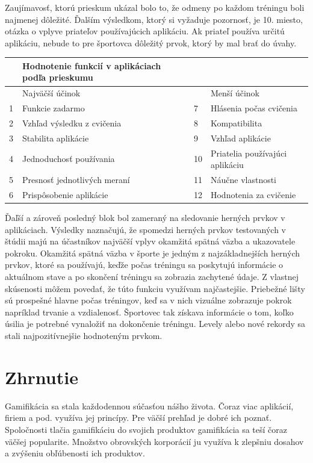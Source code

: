 \documentclass[10pt,twoside,slovak,a4paper]{article}
\begin{document}
 Zaujímavosť, ktorú prieskum ukázal bolo to, že odmeny po každom tréningu boli najmenej dôležité. Ďalším výsledkom, ktorý si vyžaduje pozornosť, je 10. miesto, otázka o vplyve priateľov používajúcich aplikáciu. Ak priateľ používa určitú aplikáciu, nebude to pre športovca dôležitý prvok, ktorý by mal brať do úvahy.\cite{Effect_of_gamification-Framework}
\hfill \break
\begin{table}[!ht]
    \centering
    \begin{tabular}{|l|l|l|l|}
    \hline
        ~ & Hodnotenie funkcií v aplikáciach podľa prieskumu & ~ & ~ \\ \hline
        ~ & Najväčší účinok & ~ & Menší účinok \\ \hline
        1 & Funkcie zadarmo & 7 & Hlásenia počas cvičenia \\ \hline
        2 & Vzhľad výsledku z cvičenia & 8 & Kompatibilita \\ \hline
        3 & Stabilita aplikácie & 9 & Vzhľad aplikácie \\ \hline
        4 & Jednoduchosť používania & 10 & Priatelia používajúci aplikáciu \\ \hline
        5 & Presnosť jednotlivých meraní & 11 & Náučne vlastnosti \\ \hline
        6 & Prispôsobenie aplikácie & 12 & Hodnotenia za cvičenie \\ \hline
    \end{tabular}
\end{table}
\newpage
Ďaľší a zároveň posledný blok bol zameraný na sledovanie herných prvkov v aplikáciach. Výsledky naznačujú, že spomedzi herných prvkov testovaných v štúdii majú na účastníkov najväčší vplyv okamžitá spätná väzba a ukazovatele pokroku.
Okamžitá spätná väzba v športe je jedným z najzákladnejších herných prvkov, ktoré sa používajú, keďže počas tréningu sa poskytujú informácie o aktuálnom stave a po skončení tréningu sa zobrazia zachytené údaje. Z vlastnej skúsenosti môžem povedať, že túto funkciu využívam najčastejšie. Priebežné lišty sú prospešné hlavne počas tréningov, keď sa v nich vizuálne zobrazuje pokrok napríklad trvanie a vzdialenosť. Športovec tak získava informácie o tom, koľko úsilia je potrebné vynaložiť na dokončenie tréningu.\cite{Effect_of_gamification-Framework} 
Levely alebo nové rekordy sa stali najpozitívnejšie hodnoteným prvkom.
\section{Zhrnutie}
Gamifikácia sa stala každodennou súčasťou nášho života. Čoraz viac aplikácií, firiem a pod. využíva jej princípy. Pre väčší prehľad je dobré ich poznať. Spoločnosti tlačia gamifikáciu do svojich produktov gamifikácia sa teší čoraz väčšej popularite. Množstvo obrovských korporácií ju využíva k zlepšniu dosahov a zvýšeniu obľúbenosti ich produktov. 
\end{document}
